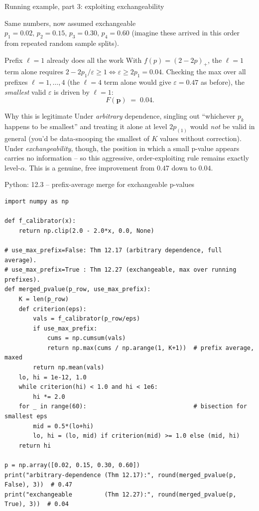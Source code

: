 \documentclass[aspectratio=169,10pt]{beamer}
\newcommand{\bp}{\mathbf{p}}
\begin{document}
\begin{frame}{Running example, part 3: exploiting exchangeability}
  \begin{block}{Same numbers, now assumed exchangeable}
    $p_1=0.02,\,p_2=0.15,\,p_3=0.30,\,p_4=0.60$ (imagine these arrived in this order from repeated random sample splits).
  \end{block}
  \begin{block}{Prefix $\ell=1$ already does all the work}
    With $f(p)=(2-2p)_+$, the $\ell=1$ term alone requires $2-2p_1/\varepsilon\ge1 \iff \varepsilon\ge2p_1=0.04$. Checking the max over all prefixes $\ell=1,\dots,4$ (the $\ell=4$ term alone would give $\varepsilon=0.47$ as before), the \emph{smallest} valid $\varepsilon$ is driven by $\ell=1$:
    \[
      F(\bp) \;=\; 0.04.
    \]
  \end{block}
  \begin{block}{Why this is legitimate}
    Under \emph{arbitrary} dependence, singling out ``whichever $p_k$ happens to be smallest'' and treating it alone at level $2p_{(1)}$ would \emph{not} be valid in general (you'd be data-snooping the smallest of $K$ values without correction). Under \emph{exchangeability}, though, the position in which a small p-value appears carries no information -- so this aggressive, order-exploiting rule remains exactly level-$\alpha$. This is a genuine, free improvement from $0.47$ down to $0.04$.
  \end{block}
\end{frame}

\begin{frame}[fragile]{Python: 12.3 -- prefix-average merge for exchangeable p-values}
  \begin{lstlisting}
import numpy as np

def f_calibrator(x):
    return np.clip(2.0 - 2.0*x, 0.0, None)

# use_max_prefix=False: Thm 12.17 (arbitrary dependence, full average).
# use_max_prefix=True : Thm 12.27 (exchangeable, max over running prefixes).
def merged_pvalue(p_row, use_max_prefix):
    K = len(p_row)
    def criterion(eps):
        vals = f_calibrator(p_row/eps)
        if use_max_prefix:
            cums = np.cumsum(vals)
            return np.max(cums / np.arange(1, K+1))  # prefix average, maxed
        return np.mean(vals)
    lo, hi = 1e-12, 1.0
    while criterion(hi) < 1.0 and hi < 1e6:
        hi *= 2.0
    for _ in range(60):                              # bisection for smallest eps
        mid = 0.5*(lo+hi)
        lo, hi = (lo, mid) if criterion(mid) >= 1.0 else (mid, hi)
    return hi

p = np.array([0.02, 0.15, 0.30, 0.60])
print("arbitrary-dependence (Thm 12.17):", round(merged_pvalue(p, False), 3))  # 0.47
print("exchangeable         (Thm 12.27):", round(merged_pvalue(p, True), 3))  # 0.04
  \end{lstlisting}
\end{frame}
\end{document}
